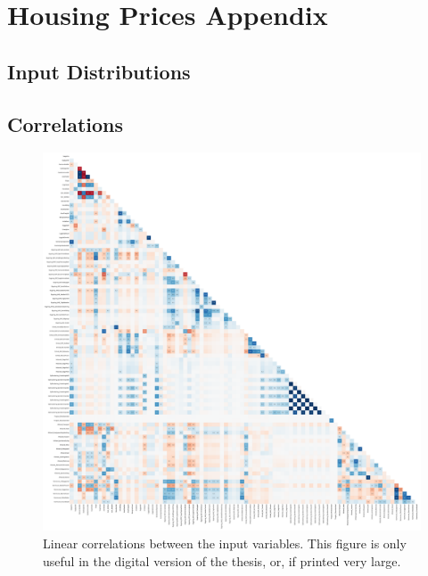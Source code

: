 
\chapter{Housing Prices Appendix}
\label{appendix:housing}

\section{Input Distributions}



\FloatBarrier
\section{Correlations}

\begin{figure}[h!]
  \centerfloat
  \includegraphics[draft=false, width=1.1\textwidth, trim=10 10 10 10, clip]{figures/housing/correlations_all.pdf}
  \caption[Linear Correlations]
          {Linear correlations between the input variables. This figure is only useful in the digital version of the thesis, or, if printed very large.}
  \label{fig:h:correlations_all_lin}
\end{figure}


